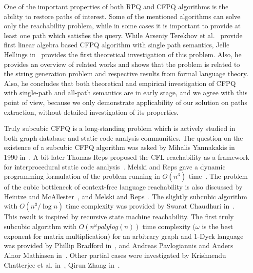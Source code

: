 One of the important properties of both RPQ and CFPQ algorithms is the ability to restore paths of interest. 
Some of the mentioned algorithms can solve only the reachability problem, while in some cases it is important to provide at least one path which satisfies the query. 
While Arseniy Terekhov et al.~\cite{10.1145/3398682.3399163} provide first linear algebra based CFPQ algorithm with single path semantics, Jelle Hellings in~\cite{!!!} provides the first theoretical investigation of this problem. Also, he provides an overview of related works and shows that the problem is related to the string generation problem and respective results from formal language theory.
Also, he concludes that both theoretical and empirical investigation of CFPQ with single-path and all-path semantics are in early stage, and we agree with this point of view, because we only demonstrate applicability of our solution on paths extraction, without detailed investigation of its properties.

Truly subcubic CFPQ is a long-standing problem which is actively studied in both graph database and static code analysis communities.
The question on the existence of a subcubic CFPQ algorithm was asked by Mihalis Yannakakis in 1990 in~\cite{Yannakakis}. A bit later Thomas Reps proposed the CFL reachability as a framework for interprocedural static code analysis~\cite{10.5555/271338.271343}. Melski and Reps gave a dynamic programming formulation of the problem running in $O(n^3)$ time~\cite{10.1145/258993.259006}. The problem of the cubic bottleneck of context-free language reachability is also discussed by Heintze and McAllester~\cite{10.5555/788019.788876}, and Melski and Reps~\cite{10.1145/258993.259006}.
The slightly subcubic algorithm with $O(n^3/\log{n})$ time complexity was provided by Swarat Chaudhuri in~\cite{10.1145/1328897.1328460}. This result is inspired by recursive state machine reachability.
The first truly subcubic algorithm with $O(n^\omega polylog(n))$ time complexity ($\omega$ is the best exponent for matrix multiplication) for an arbitrary graph and 1-Dyck language was provided by Phillip Bradford in~\cite{Bradford2017EfficientEP}, and Andreas Pavlogiannis and Anders Alnor Mathiasen in~\cite{pavlogiannis2020finegrained}.
Other partial cases were investigated by Krishnendu Chatterjee et al. in~\cite{10.1145/3158118}, Qirun Zhang in~\cite{zhang2020conditional}.

